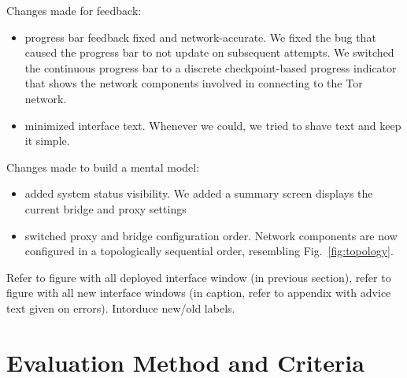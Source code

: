 \documentclass[USenglish,oneside,twocolumn]{article}
\begin{document}
{Changes made for feedback: 
\begin{itemize}
\item progress bar feedback fixed and network-accurate. We fixed the bug that caused the progress bar to not update on subsequent attempts. We switched the continuous progress bar to a discrete checkpoint-based progress indicator that shows the network components involved in connecting to the Tor network. 
\item minimized interface text. Whenever we could, we tried to shave text and keep it simple. 
\end{itemize}

Changes made to build a mental model:
\begin{itemize}
\item added system status visibility. We added a summary screen displays the current bridge and proxy settings
\item switched proxy and bridge configuration order. Network components are now configured in a topologically sequential order, resembling Fig.~\ref{fig:topology}.
\end{itemize}

Refer to figure with all deployed interface window (in previous section), refer to figure with all new interface windows (in caption, refer to appendix with advice text given on errors). Intorduce new/old labels. 
}

\section{Evaluation Method and Criteria}
\label{sec:eval}
\end{document}
